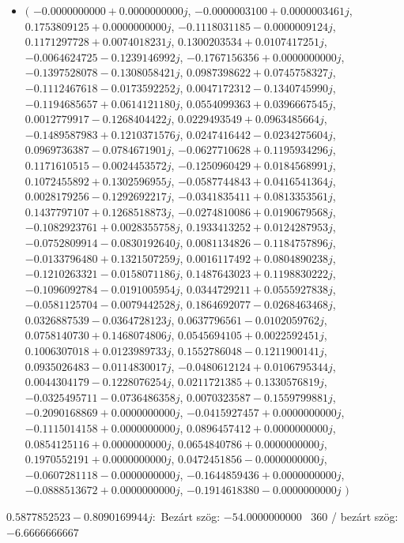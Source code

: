 \documentclass[14pt,a4paper]{article}
\begin{document}
\begin{itemize}
\item
$\big($
$-0.0000000000+0.0000000000j$, $-0.0000003100+0.0000003461j$, $0.1753809125+0.0000000000j$, $-0.1118031185-0.0000009124j$, $0.1171297728+0.0074018231j$, $0.1300203534+0.0107417251j$, $-0.0064624725-0.1239146992j$, $-0.1767156356+0.0000000000j$, $-0.1397528078-0.1308058421j$, $0.0987398622+0.0745758327j$, $-0.1112467618-0.0173592252j$, $0.0047172312-0.1340745990j$, $-0.1194685657+0.0614121180j$, $0.0554099363+0.0396667545j$, $0.0012779917-0.1268404422j$, $0.0229493549+0.0963485664j$, $-0.1489587983+0.1210371576j$, $0.0247416442-0.0234275604j$, $0.0969736387-0.0784671901j$, $-0.0627710628+0.1195934296j$, $0.1171610515-0.0024453572j$, $-0.1250960429+0.0184568991j$, $0.1072455892+0.1302596955j$, $-0.0587744843+0.0416541364j$, $0.0028179256-0.1292692217j$, $-0.0341835411+0.0813353561j$, $0.1437797107+0.1268518873j$, $-0.0274810086+0.0190679568j$, $-0.1082923761+0.0028355758j$, $0.1933413252+0.0124287953j$, $-0.0752809914-0.0830192640j$, $0.0081134826-0.1184757896j$, $-0.0133796480+0.1321507259j$, $0.0016117492+0.0804890238j$, $-0.1210263321-0.0158071186j$, $0.1487643023+0.1198830222j$, $-0.1096092784-0.0191005954j$, $0.0344729211+0.0555927838j$, $-0.0581125704-0.0079442528j$, $0.1864692077-0.0268463468j$, $0.0326887539-0.0364728123j$, $0.0637796561-0.0102059762j$, $0.0758140730+0.1468074806j$, $0.0545694105+0.0022592451j$, $0.1006307018+0.0123989733j$, $0.1552786048-0.1211900141j$, $0.0935026483-0.0114830017j$, $-0.0480612124+0.0106795344j$, $0.0044304179-0.1228076254j$, $0.0211721385+0.1330576819j$, $-0.0325495711-0.0736486358j$, $0.0070323587-0.1559799881j$, $-0.2090168869+0.0000000000j$, $-0.0415927457+0.0000000000j$, $-0.1115014158+0.0000000000j$, $0.0896457412+0.0000000000j$, $0.0854125116+0.0000000000j$, $0.0654840786+0.0000000000j$, $0.1970552191+0.0000000000j$, $0.0472451856-0.0000000000j$, $-0.0607281118-0.0000000000j$, $-0.1644859436+0.0000000000j$, $-0.0888513672+0.0000000000j$, $-0.1914618380-0.0000000000j$
$\big)$
\end{itemize}
$0.5877852523-0.8090169944j$:\
Bezárt szög: $-54.0000000000$ \
360 / bezárt szög: $-6.6666666667$\
\end{document}
